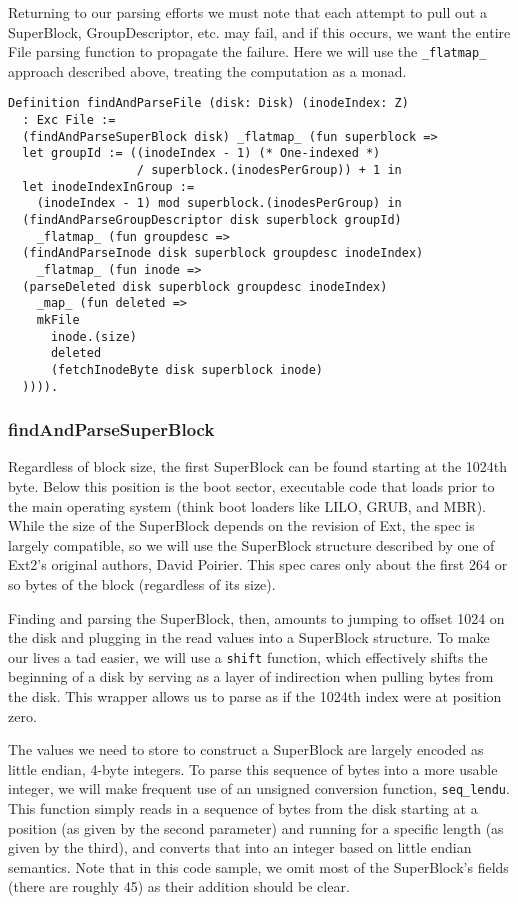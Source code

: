 \documentclass[nocopyrightspace]{sigplanconf}
\begin{document}
Returning to our parsing efforts we must note that each attempt to pull out a
SuperBlock, GroupDescriptor, etc. may fail, and if this occurs, we want the
entire File parsing function to propagate the failure. Here we will use the
{\tt \_flatmap\_} approach described above, treating the computation as a
monad.

\begin{lstlisting}
Definition findAndParseFile (disk: Disk) (inodeIndex: Z) 
  : Exc File :=
  (findAndParseSuperBlock disk) _flatmap_ (fun superblock =>
  let groupId := ((inodeIndex - 1) (* One-indexed *)
                  / superblock.(inodesPerGroup)) + 1 in
  let inodeIndexInGroup := 
    (inodeIndex - 1) mod superblock.(inodesPerGroup) in
  (findAndParseGroupDescriptor disk superblock groupId) 
    _flatmap_ (fun groupdesc =>
  (findAndParseInode disk superblock groupdesc inodeIndex) 
    _flatmap_ (fun inode =>
  (parseDeleted disk superblock groupdesc inodeIndex) 
    _map_ (fun deleted =>
    mkFile
      inode.(size)
      deleted
      (fetchInodeByte disk superblock inode)
  )))).
\end{lstlisting}

\subsubsection{findAndParseSuperBlock}

Regardless of block size, the first SuperBlock can be found starting at the
1024th byte. Below this position is the boot sector, executable code that
loads prior to the main operating system (think boot loaders like LILO, GRUB,
and MBR). While the size of the SuperBlock depends on the revision of Ext, the
spec is largely compatible, so we will use the SuperBlock structure described
by one of Ext2's original authors, David Poirier\cite{non-gnu}. This spec
cares only about the first 264 or so bytes of the block (regardless of its
size).

Finding and parsing the SuperBlock, then, amounts to jumping to offset 1024 on
the disk and plugging in the read values into a SuperBlock structure. To make
our lives a tad easier, we will use a {\tt shift} function, which effectively
shifts the beginning of a disk by serving as a layer of indirection when
pulling bytes from the disk. This wrapper allows us to parse as if the 1024th
index were at position zero.

The values we need to store to construct a SuperBlock are largely encoded as
little endian, 4-byte integers. To parse this sequence of bytes into a more
usable integer, we will make frequent use of an unsigned conversion function,
{\tt seq\_lendu}. This function simply reads in a sequence of bytes from the
disk starting at a position (as given by the second parameter) and running for
a specific length (as given by the third), and converts that into an integer
based on little endian semantics. Note that in this code sample, we omit most
of the SuperBlock's fields (there are roughly 45) as their addition should be
clear.
\end{document}
